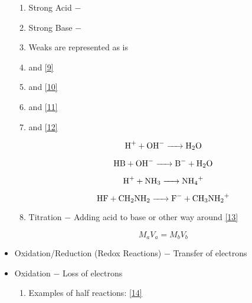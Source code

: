 \documentclass[12pt]{article}
\begin{document}
\begin{itemize}
\begin{enumerate}
    \item Strong Acid $-$  

    \item Strong Base $-$ 

    \item Weaks are represented as is

    \item {} and  \eqref{9}

    \item {} and  \eqref{10}

    \item {} and  \eqref{11}

    \item {} and  \eqref{12}

      \begin{equation}
        \ce{H+ + OH- -> H2O}
        \label{9}
      \end{equation}

      \begin{equation}
        \ce{HB + OH- -> B- + H2O}
        \label{10}
      \end{equation}

      \begin{equation}
        \ce{H+ + NH3 -> NH4+}
        \label{11}
      \end{equation}
      
      \begin{equation}
        \ce{HF + CH2NH2 -> F- + CH3NH2+}
        \label{12}
      \end{equation}

    \item Titration $-$ Adding acid to base or other way around \eqref{13}

      \begin{equation}
        M_aV_a=M_bV_b
        \label{13}
      \end{equation}

    \end{enumerate}

  \item Oxidation/Reduction (Redox Reactions) $-$ Transfer of electrons

  \item Oxidation $-$ Loss of electrons

    \begin{enumerate}
      \item Examples of half reactions: \eqref{14}
    \end{enumerate}


\end{itemize}
\end{document}
